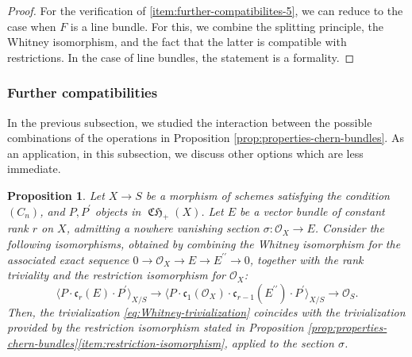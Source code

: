 \documentclass[JEP,XML,SOM,Unicode,published]{cedram}
\theoremstyle{plain}
\newtheorem{proposition}[theorem]{Proposition}
\theoremstyle{definition}
\newcommand{\Ocal}{\mathcal O}
\newcommand{\cfrak}{\mathfrak c}
\newcommand{\bis}{\prime\prime}
\DeclareMathOperator{\CHfrak}{\mathfrak{CH}}
\begin{document}
\begin{proof}
For the verification of \eqref{item:further-compatibilites-5}, we can reduce to the case when $F$ is a line bundle. For this, we combine the splitting principle, the Whitney isomorphism, and the fact that the latter is compatible with restrictions. In the case of line bundles, the statement is a formality.
\end{proof}

\subsubsection{Further compatibilities}

In the previous subsection, we studied the interaction between the possible combinations of the operations in Proposition \ref{prop:properties-chern-bundles}. As an application, in this subsection, we discuss other options which are less immediate.
\begin{proposition}\label{prop:newranktriviality}
Let $X\to S$ be a morphism of schemes satisfying the condition $(C_{n})$, and $P,P^{\prime}$ objects in $\CHfrak_{+}(X)$. Let $E$ be a vector bundle of constant rank $r$ on $X$, admitting a nowhere vanishing section $\sigma\colon\Ocal_{X}\to E$. Consider the following isomorphisms, obtained by combining the Whitney isomorphism for the associated exact sequence $0\to\Ocal_{X}\to E\to E^{\bis}\to 0$, together with the rank triviality and the restriction isomorphism for $\Ocal_{X}$:
\begin{equation}\label{eq:Whitney-trivialization}
\langle P\cdot\cfrak_{r}(E)\cdot P^{\prime}\rangle_{X/S}\to\langle P\cdot\cfrak_{1}(\Ocal_{X})\cdot\cfrak_{r-1}(E^{\bis})\cdot P^{\prime}\rangle_{X/S}\to\Ocal_{S}.
\end{equation}Then, the trivialization \eqref{eq:Whitney-trivialization} coincides with the trivialization provided by the restriction isomorphism stated in Proposition \ref{prop:properties-chern-bundles}\eqref{item:restriction-isomorphism}, applied to the section $\sigma$.
\end{proposition}
\end{document}
